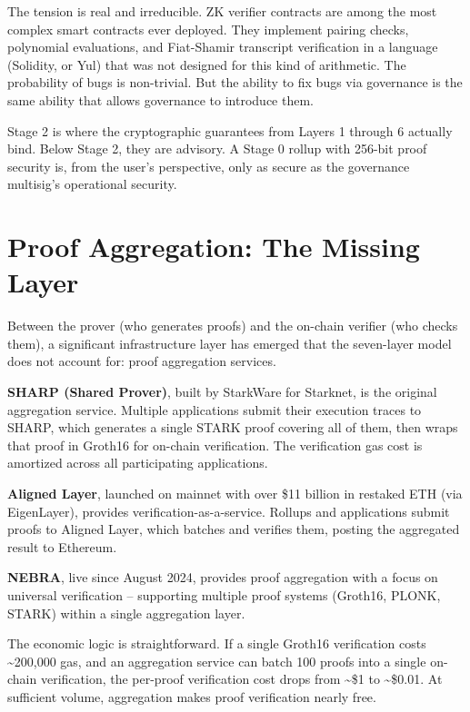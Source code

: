 \documentclass[
  11pt,
  openany]{report}
\renewcommand{\textbf}[1]{{\bfseries\color{MidnightBold}#1}}
\begin{document}
The tension is real and irreducible. ZK verifier contracts are among the most
complex smart contracts ever deployed. They implement pairing checks, polynomial
evaluations, and Fiat-Shamir transcript verification in a language (Solidity, or
Yul) that was not designed for this kind of arithmetic. The probability of bugs
is non-trivial. But the ability to fix bugs via governance is the same ability
that allows governance to introduce them.

Stage 2 is where the cryptographic guarantees from Layers 1 through 6 actually
bind. Below Stage 2, they are advisory. A Stage 0 rollup with 256-bit proof
security is, from the user's perspective, only as secure as the governance
multisig's operational security.

\section{Proof Aggregation: The Missing
Layer}\label{proof-aggregation-the-missing-layer}

Between the prover (who generates proofs) and the on-chain verifier (who checks
them), a significant infrastructure layer has emerged that the seven-layer model
does not account for: proof aggregation services.

\textbf{SHARP (Shared Prover)}, built by StarkWare for Starknet, is the original
aggregation service. Multiple applications submit their execution traces to
SHARP, which generates a single STARK proof covering all of them, then wraps
that proof in Groth16 for on-chain verification. The verification gas cost is
amortized across all participating applications.

\textbf{Aligned Layer}, launched on mainnet with over \$11 billion in restaked
ETH (via EigenLayer), provides verification-as-a-service. Rollups and
applications submit proofs to Aligned Layer, which batches and verifies them,
posting the aggregated result to Ethereum.

\textbf{NEBRA}, live since August 2024, provides proof aggregation with a focus
on universal verification -- supporting multiple proof systems (Groth16, PLONK,
STARK) within a single aggregation layer.

The economic logic is straightforward. If a single Groth16 verification costs
\textasciitilde200,000 gas, and an aggregation service can batch 100 proofs into
a single on-chain verification, the per-proof verification cost drops from
\textasciitilde\$1 to \textasciitilde\$0.01. At sufficient volume, aggregation
makes proof verification nearly free.
\end{document}
